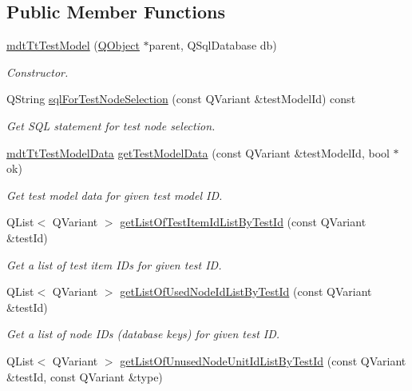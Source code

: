 \subsection*{Public Member Functions}
\begin{DoxyCompactItemize}
\item 
\hyperlink{classmdt_tt_test_model_aa21b9dd55ddc60ee59a5d804e45a163a}{mdt\-Tt\-Test\-Model} (\hyperlink{class_q_object}{Q\-Object} $\ast$parent, Q\-Sql\-Database db)
\begin{DoxyCompactList}\small\item\em Constructor. \end{DoxyCompactList}\item 
Q\-String \hyperlink{classmdt_tt_test_model_a1c7dd9400f00516e054befbf4de53dbb}{sql\-For\-Test\-Node\-Selection} (const Q\-Variant \&test\-Model\-Id) const 
\begin{DoxyCompactList}\small\item\em Get S\-Q\-L statement for test node selection. \end{DoxyCompactList}\item 
\hyperlink{classmdt_tt_test_model_data}{mdt\-Tt\-Test\-Model\-Data} \hyperlink{classmdt_tt_test_model_a5d226f2eb40de06f2a58b679c8e1df4a}{get\-Test\-Model\-Data} (const Q\-Variant \&test\-Model\-Id, bool $\ast$ok)
\begin{DoxyCompactList}\small\item\em Get test model data for given test model I\-D. \end{DoxyCompactList}\item 
Q\-List$<$ Q\-Variant $>$ \hyperlink{classmdt_tt_test_model_ae9845c11407a0b1db1e37fc40b6ae8b0}{get\-List\-Of\-Test\-Item\-Id\-List\-By\-Test\-Id} (const Q\-Variant \&test\-Id)
\begin{DoxyCompactList}\small\item\em Get a list of test item I\-Ds for given test I\-D. \end{DoxyCompactList}\item 
Q\-List$<$ Q\-Variant $>$ \hyperlink{classmdt_tt_test_model_ade332c342894ccfc87bb901427a9d440}{get\-List\-Of\-Used\-Node\-Id\-List\-By\-Test\-Id} (const Q\-Variant \&test\-Id)
\begin{DoxyCompactList}\small\item\em Get a list of node I\-Ds (database keys) for given test I\-D. \end{DoxyCompactList}\item 
Q\-List$<$ Q\-Variant $>$ \hyperlink{classmdt_tt_test_model_af3641e8ec4479fa63b0fd01dd6548a72}{get\-List\-Of\-Unused\-Node\-Unit\-Id\-List\-By\-Test\-Id} (const Q\-Variant \&test\-Id, const Q\-Variant \&type)

\end{DoxyCompactItemize}
